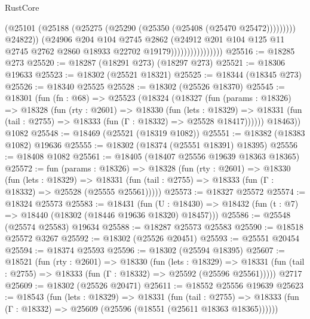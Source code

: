 \begin{lexlean}{RustCore}
\begin{coremodule}
                                        (@25101
                                          (@25188
                                            (@25275 (@25290 (@25350 (@25408 (@25470 @25472)))))))))
                                    @24822))
                                (@24906
                                  @204
                                  @104
                                  @2745
                                  @2862
                                  (@24912
                                    @201
                                    @104
                                    @125
                                    @11
                                    @2745
                                    @2762
                                    @2860
                                    @18933
                                    @22702
                                    @19179))))))))))))))))
@25516 := @18285 @273
@25520 := @18287 (@18291 @273) (@18297 @273)
@25521 := @18306 @19633
@25523 := @18302 (@25521 @18321)
@25525 := @18344 (@18345 @273)
@25526 := @18340 @25525
@25528 := @18302 (@25526 @18370)
@25545 := @18301
    (fun (fn : @68) =>
    @25523
      (@18324
        (@18327
          (fun (params : @18326) =>
          @18328
            (fun (rty : @2601) =>
            @18330
              (fun (lets : @18329) =>
              @18331 (fun (tail : @2755) => @18333 (fun (Γ : @18332) => @25528 @18417))))))
        @18463))
    @1082
@25548 := @18469 (@25521 (@18319 @1082))
@25551 := @18382 (@18383 @1082) @19636
@25555 := @18302 (@18374 (@25551 @18391) @18395)
@25556 := @18408 @1082
@25561 := @18405 (@18407 @25556 @19639 @18363 @18365)
@25572 := fun (params : @18326) =>
  @18328
    (fun (rty : @2601) =>
    @18330
      (fun (lets : @18329) =>
      @18331 (fun (tail : @2755) => @18333 (fun (Γ : @18332) => @25528 (@25555 @25561)))))
@25573 := @18327 @25572
@25574 := @18324 @25573
@25583 := @18431
    (fun (U : @18430) => @18432 (fun (t : @7) => @18440 (@18302 (@18446 @19636 @18320) @18457)))
@25586 := @25548 (@25574 @25583) @19634
@25588 := @18287 @25573 @25583
@25590 := @18518 @25572 @3267
@25592 := @18302 (@25526 @20451)
@25593 := @25551 @20454
@25594 := @18374 @25593
@25596 := @18302 (@25594 @18395)
@25607 := @18521
    (fun (rty : @2601) =>
    @18330
      (fun (lets : @18329) =>
      @18331 (fun (tail : @2755) => @18333 (fun (Γ : @18332) => @25592 (@25596 @25561)))))
    @2717
@25609 := @18302 (@25526 @20471)
@25611 := @18552 @25556 @19639
@25623 := @18543
    (fun (lets : @18329) =>
    @18331
      (fun (tail : @2755) =>
      @18333 (fun (Γ : @18332) => @25609 (@25596 (@18551 (@25611 @18363 @18365))))))

\end{coremodule}
\end{lexlean}
